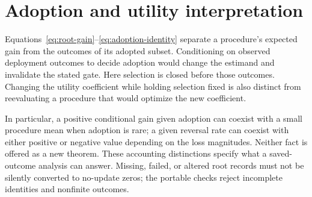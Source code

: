 \documentclass[10pt,letterpaper]{article}
\begin{document}
\section{Adoption and utility interpretation}
Equations~\ref{eq:root-gain}--\ref{eq:adoption-identity} separate a procedure's expected gain from the outcomes of its adopted subset. Conditioning on observed deployment outcomes to decide adoption would change the estimand and invalidate the stated gate. Here selection is closed before those outcomes. Changing the utility coefficient while holding selection fixed is also distinct from reevaluating a procedure that would optimize the new coefficient.

In particular, a positive conditional gain given adoption can coexist with a small procedure mean when adoption is rare; a given reversal rate can coexist with either positive or negative value depending on the loss magnitudes. Neither fact is offered as a new theorem. These accounting distinctions specify what a saved-outcome analysis can answer. Missing, failed, or altered root records must not be silently converted to no-update zeros; the portable checks reject incomplete identities and nonfinite outcomes.
\end{document}
